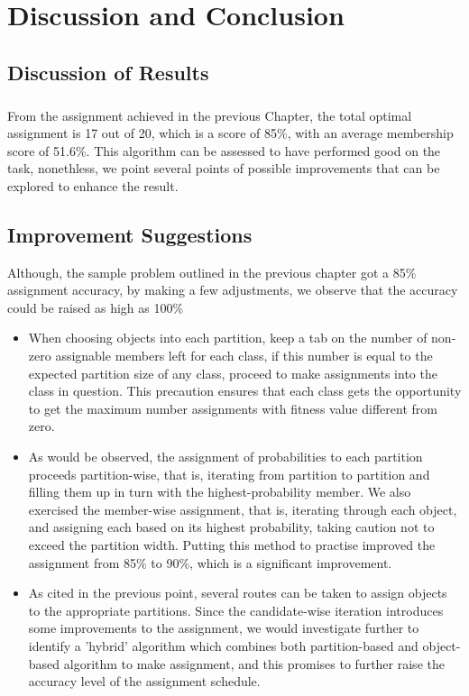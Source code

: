 \documentclass[a4paper,openany]{book}
\begin{document}
	\chapter{Discussion and Conclusion}
		\section{Discussion of Results}
			\paragraph{}
				From the assignment achieved in the previous Chapter, the total optimal assignment is 17 out of 20, which is a score of 85\%, with an average membership score of 51.6\%. This algorithm can be assessed to have performed good on the task, nonethless, we point several points of possible improvements that can be explored to enhance the result.
		\section{Improvement Suggestions}
			Although, the sample problem outlined in the previous chapter got a 85\% assignment accuracy, by making a few adjustments, we observe that the accuracy could be raised as high as 100\%
			\begin{itemize}
				\item When choosing objects into each partition, keep a tab on the number of non-zero assignable members left for each class, if this number is equal to the expected partition size of any class, proceed to make assignments into the class in question. This precaution ensures that each class gets the opportunity to get the maximum number assignments with fitness value different from zero.
				\item As would be observed, the assignment of probabilities to each partition proceeds partition-wise, that is, iterating from partition to partition and filling them up in turn with the highest-probability member. We also exercised the member-wise assignment, that is, iterating through each object, and assigning each based on its highest probability, taking caution not to exceed the partition width. Putting this method to practise improved the assignment from 85\% to 90\%, which is a significant improvement.
				\item As cited in the previous point, several routes can be taken to assign objects to the appropriate partitions. Since the candidate-wise iteration introduces some improvements to the assignment, we would investigate further to identify a 'hybrid' algorithm which combines both partition-based and object-based algorithm to make assignment, and this promises to further raise the accuracy level of the assignment schedule.
			\end{itemize}
\end{document}
